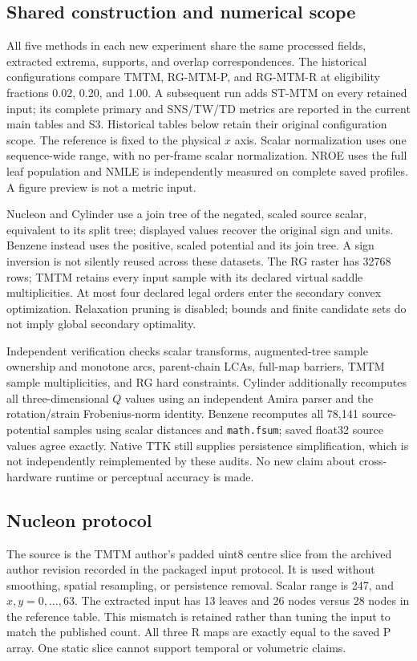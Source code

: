 \subsection{Shared construction and numerical scope}
All five methods in each new experiment share the same processed fields, extracted extrema, supports, and overlap correspondences. The historical configurations compare TMTM, RG-MTM-P, and RG-MTM-R at eligibility fractions 0.02, 0.20, and 1.00. A subsequent run adds ST-MTM on every retained input; its complete primary and SNS/TW/TD metrics are reported in the current main tables and S3. Historical tables below retain their original configuration scope. The reference is fixed to the physical $x$ axis. Scalar normalization uses one sequence-wide range, with no per-frame scalar normalization. NROE uses the full leaf population and NMLE is independently measured on complete saved profiles. A figure preview is not a metric input.

Nucleon and Cylinder use a join tree of the negated, scaled source scalar, equivalent to its split tree; displayed values recover the original sign and units. Benzene instead uses the positive, scaled potential and its join tree. A sign inversion is not silently reused across these datasets. The RG raster has 32768 rows; TMTM retains every input sample with its declared virtual saddle multiplicities. At most four declared legal orders enter the secondary convex optimization. Relaxation pruning is disabled; bounds and finite candidate sets do not imply global secondary optimality.

Independent verification checks scalar transforms, augmented-tree sample ownership and monotone arcs, parent-chain LCAs, full-map barriers, TMTM sample multiplicities, and RG hard constraints. Cylinder additionally recomputes all three-dimensional $Q$ values using an independent Amira parser and the rotation/strain Frobenius-norm identity. Benzene recomputes all 78,141 source-potential samples using scalar distances and \texttt{math.fsum}; saved float32 source values agree exactly. Native TTK still supplies persistence simplification, which is not independently reimplemented by these audits. No new claim about cross-hardware runtime or perceptual accuracy is made.

\subsection{Nucleon protocol}
The source is the TMTM author's padded uint8 centre slice from the archived author revision recorded in the packaged input protocol. It is used without smoothing, spatial resampling, or persistence removal. Scalar range is 247, and $x,y=0,\ldots,63$. The extracted input has 13 leaves and 26 nodes versus 28 nodes in the reference table. This mismatch is retained rather than tuning the input to match the published count. All three R maps are exactly equal to the saved P array. One static slice cannot support temporal or volumetric claims.

